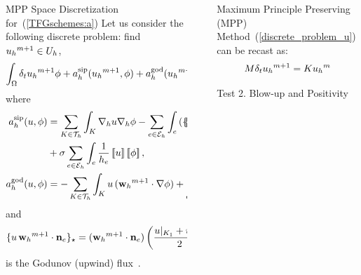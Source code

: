 \documentclass[final]{beamer}
\newlength{\sepwid}
\newlength{\onecolwid}
\begin{document}
\begin{frame}[t]
\begin{columns}[t]
\begin{column}{\onecolwid}
\begin{block}{MPP Space Discretization for~(\ref{TFGschemes:a})}
        Let us consider the following discrete problem: find
        ${{u_{h}}^{m+1}}\in U_h$,
        \begin{equation}
        \label{discrete_problem_u}
          \int_\Omega \delta_t{{u_{h}}^{m+1}} \phi + a_h^{\mathrm{sip}}({{u_{h}}^{m+1}},\phi) + a_h^{\mathrm{god}}({{u_{h}}^{m+1}},\phi)=0 \quad \forall\phi\in U_h,
        \end{equation}
        where
        \begin{align*}
          \asip(u,\phi) &= \sum_{K\in\mathcal{T}_h}\int_K\nabla_h u\nabla_h \phi-\sum_{e\in\mathcal{E}_h}\int_e\left(\average{\nabla_h u\cdot\mathbf{n}_e}\jump{\phi}+\average{\nabla_h \phi\cdot\mathbf{n}_e}\jump{u}\right)\\&+\sigma\sum_{e\in\mathcal{E}_h}\int_e\frac{1}{h_e}\jump{u}\jump{\phi},
          \\
          \agod(u,\phi) &= -\sum_{K \in\mathcal{T}_h} \int_K u \, (\wwmm\cdot \grad\phi)
                            + \sum_{e\in\Eh}\{ u \, \wwmm \cdot \nn_e\}_\star
        \end{align*}
        and
        $$
        \{ u \, {{\mathbf{w}_{h}}^{m+1}} \cdot \mathbf{n}_e\}_\star=({{\mathbf{w}_{h}}^{m+1}}\cdot \mathbf{n}_e)\left(\frac{u|_{K_1}+u|_{K_2}}{2}\right)-\frac{1}{2}|{{\mathbf{w}_{h}}^{m+1}}\cdot\mathbf{n}_e|\left[\!\left[u\right]\!\right]
        $$
        is the Godunov (upwind) flux~\cite{anderson_high-order_2017}.

      \end{block}

    \end{column}



    \begin{column}{\sepwid}  \end{column}

    \vspace*{0.5cm}

    \begin{column}{\onecolwid} %
      \begin{block}{Maximum Principle Preserving (MPP)}
        Method~(\ref{discrete_problem_u}) can be recast as:
        \begin{equation}
          \label{eq:1}
          M \delta_t {{u_{h}}^{m+1}} = K {{u_{h}}^{m}}
        \end{equation}
      \end{block}


      \vspace{0.2cm}

      \begin{block}{Test 2. Blow-up and Positivity}
      \end{block}


\end{column}
\end{columns}
\end{frame}
\end{document}
